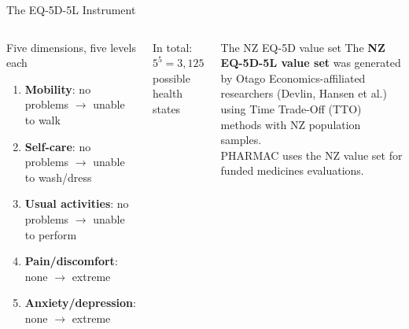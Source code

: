 \documentclass[aspectratio=169, 12pt]{beamer}
\begin{document}
\begin{frame}{The EQ-5D-5L Instrument}
  \begin{columns}
      \begin{block}{Five dimensions, five levels each}
        \begin{enumerate}
          \item \textbf{Mobility}: no problems $\to$ unable to walk
          \item \textbf{Self-care}: no problems $\to$ unable to wash/dress
          \item \textbf{Usual activities}: no problems $\to$ unable to perform
          \item \textbf{Pain/discomfort}: none $\to$ extreme
          \item \textbf{Anxiety/depression}: none $\to$ extreme
        \end{enumerate}
      \end{block}
      In total: $5^5 = 3{,}125$ possible health states
      \begin{alertblock}{The NZ EQ-5D value set}
        The \textbf{NZ EQ-5D-5L value set} was generated by Otago Economics-affiliated researchers
        (Devlin, Hansen et al.) using Time Trade-Off (TTO) methods with NZ population samples.\\[0.3em]
        PHARMAC uses the NZ value set for funded medicines evaluations.
      \end{alertblock}
  \end{columns}
\end{frame}
\end{document}
